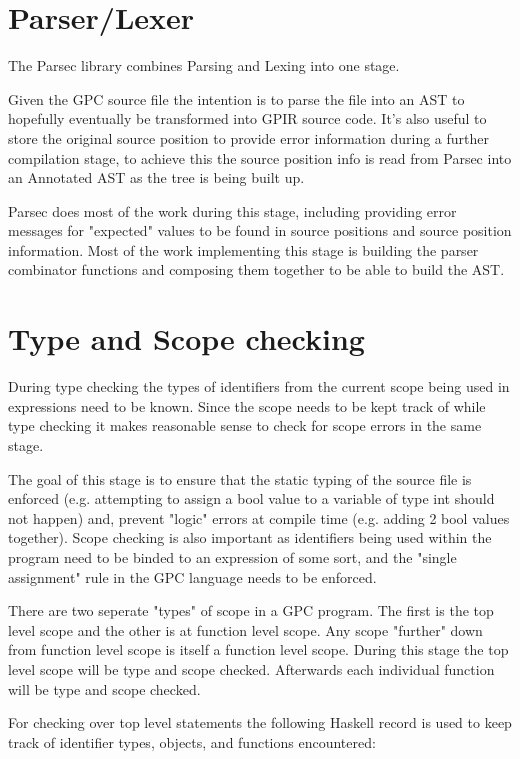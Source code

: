     
\section{Parser/Lexer}
The Parsec library combines Parsing and Lexing into one stage.

Given the GPC source file the intention is to parse the file into an AST
to hopefully eventually be transformed into GPIR source code. It's
also useful to store the original source position to provide error information 
during a further compilation stage, to achieve this the source position
info is read from Parsec into an Annotated AST as the tree is being built up.

Parsec does most of the work during this stage, including
providing error messages for "expected" values to be found in source
positions and source position information. Most of the work implementing
this stage is building the parser combinator functions and composing
them together to be able to build the AST.


\section{Type and Scope checking}

During type checking the types of identifiers from the current scope being used in expressions need
to be known. Since the scope needs to be kept track of while type checking it makes reasonable
sense to check for scope errors in the same stage.

The goal of this stage is to ensure that the static typing of the source file
is enforced (e.g. attempting to assign a bool value to a variable of type int should not happen) and,
prevent "logic" errors at compile time (e.g. adding 2 bool values together). Scope checking
is also important as identifiers being used within the program need to be binded to an expression of
some sort, and the "single assignment" rule in the GPC language needs to be enforced.

There are two seperate "types" of scope in a GPC program. The first is the top level scope and the
other is at function level scope. Any scope "further" down from function level scope is itself
a function level scope. During this stage the top level scope will be type and scope checked.
Afterwards each individual function will be type and scope checked.

For checking over top level statements the following Haskell record is used
to keep track of identifier types, objects, and functions encountered:

